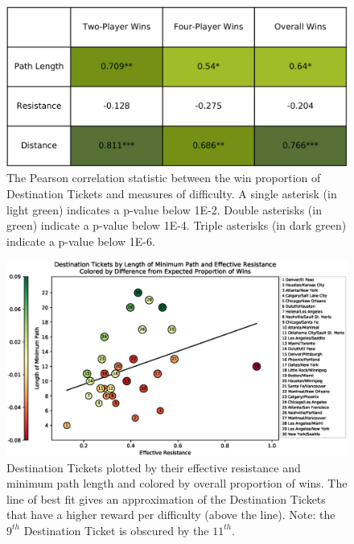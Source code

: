 \begin{multicols}{2}
\begin{figure}[H]
    \centering
    \includegraphics[scale=.12]{figures/pearsons_table.png}
    \caption{The Pearson correlation statistic between
    the win proportion of Destination Tickets
    and measures of difficulty.
    A single asterisk (in light green) indicates a p-value
    below 1E-2. Double asterisks (in green) indicate a
    p-value below 1E-4. Triple asterisks (in dark green)
    indicate a p-value below 1E-6.}
    \label{fig:correlation_table}
\end{figure}

\end{multicols}
\begin{figure}
    \centering
    \includegraphics[scale=.6]{figures/resistance_aggregate}
    \caption{Destination Tickets plotted by their effective
    resistance and minimum path length and colored
    by overall proportion of wins.
    The line of best fit gives an approximation of the
    Destination Tickets that have a higher reward per difficulty
    (above the line).
    Note: the $9^{th}$ Destination Ticket 
    is obscured by the $11^{th}$.}
    \label{fig:resistance}
\end{figure}
